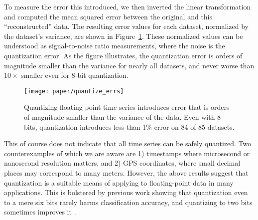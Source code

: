 To measure the error this introduced, we then inverted the linear transformation and computed the mean squared error between the original and this ``reconstructed'' data. The resulting error values for each dataset, normalized by the dataset's variance, are shown in Figure~\ref{fig:quantize_errs}. These normalized values can be understood as signal-to-noise ratio measurements, where the noise is the quantization error. As the figure illustrates, the quantization error is orders of magnitude smaller than the variance for nearly all datasets, and never worse than $10\times$ smaller even for 8-bit quantization.

\begin{figure}[h]
\begin{center}
    \texttt{[image: paper/quantize\_errs]}
    \caption{Quantizing floating-point time series introduces error that is orders of magnitude smaller than the variance of the data. Even with 8 bits, quantization introduces less than 1\% error on 84 of 85 datasets.}
    \label{fig:quantize_errs}
\end{center}
\end{figure}

This of course does not indicate that all time series can be safely quantized. Two counterexamples of which we are aware are 1) timestamps where microsecond or nanosecond resolution matters, and 2) GPS coordinates, where small decimal places may correspond to many meters. However, the above results suggest that quantization is a suitable means of applying \minesp to floating-point data in many applications. This is bolstered by previous work showing that quantization even to a mere six bits \cite{epenthesis} rarely harms classification accuracy, and quantizing to two bits sometimes improves it \cite{saxvsm}.



